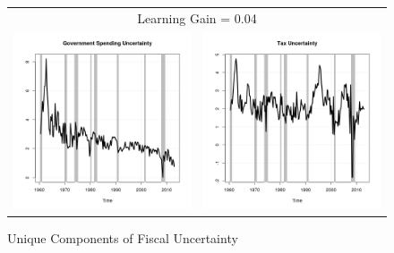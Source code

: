 \documentclass[11pt]{article}
\begin{document}
\begin{figure}\caption{Unique Components of Fiscal Uncertainty}\label{fg:fpuremove0.04}
\begin{center}
\begin{tabular}{cc}
\multicolumn{2}{c}{Learning Gain = 0.04} \\ [0.5pc]
\includegraphics[scale=0.45]{./results/pics0.04/fpucoin_gov.png} & \includegraphics[scale=0.45]{./results/pics0.04/fpucoin_tax.png} \\

\end{tabular}
\end{center}
\end{figure}
\end{document}
